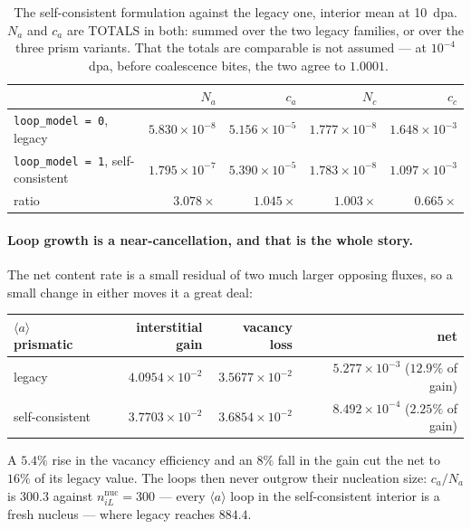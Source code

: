 \documentclass[11pt]{article}
\newcommand{\aloop}{\ensuremath{\langle a\rangle}}
\newcommand{\code}[1]{\texttt{\small #1}}
\begin{document}
\begin{table}[htbp]
\centering
\caption{The self-consistent formulation against the legacy one, interior mean
         at 10~\textrm{dpa}. $N_a$ and $c_a$ are TOTALS in both: summed over the
         two legacy families, or over the three prism variants. That the totals
         are comparable is not assumed --- at $10^{-4}$~\textrm{dpa}, before
         coalescence bites, the two agree to $1.0001$.}
\label{tab:lm-measured}
\begin{tabular}{@{}lrrrr@{}}
\toprule
 & $N_a$ & $c_a$ & $N_c$ & $c_c$ \\
\midrule
\code{loop\_model = 0}, legacy           & $5.830\times10^{-8}$ & $5.156\times10^{-5}$ & $1.777\times10^{-8}$ & $1.648\times10^{-3}$ \\
\code{loop\_model = 1}, self-consistent  & $1.795\times10^{-7}$ & $5.390\times10^{-5}$ & $1.783\times10^{-8}$ & $1.097\times10^{-3}$ \\
\quad ratio                              & $\mathbf{3.078\times}$ & $1.045\times$ & $1.003\times$ & $\mathbf{0.665\times}$ \\
\bottomrule
\end{tabular}
\end{table}

\paragraph{Loop growth is a near-cancellation, and that is the whole story.}
The net content rate is a small residual of two much larger opposing fluxes, so
a small change in either moves it a great deal:

\begin{center}
\begin{tabular}{@{}lrrr@{}}
\toprule
\aloop{} prismatic & interstitial gain & vacancy loss & net \\
\midrule
legacy           & $4.0954\times10^{-2}$ & $3.5677\times10^{-2}$ & $5.277\times10^{-3}$ ($12.9\%$ of gain) \\
self-consistent  & $3.7703\times10^{-2}$ & $3.6854\times10^{-2}$ & $8.492\times10^{-4}$ ($2.25\%$ of gain) \\
\bottomrule
\end{tabular}
\end{center}

A $5.4\%$ rise in the vacancy efficiency and an $8\%$ fall in the gain cut the
net to $16\%$ of its legacy value. The loops then never outgrow their
nucleation size: $c_a/N_a$ is $\mathbf{300.3}$ against
$n^{\mathrm{nuc}}_{iL} = 300$ --- every \aloop{} loop in the self-consistent
interior is a fresh nucleus --- where legacy reaches $884.4$.
\end{document}
